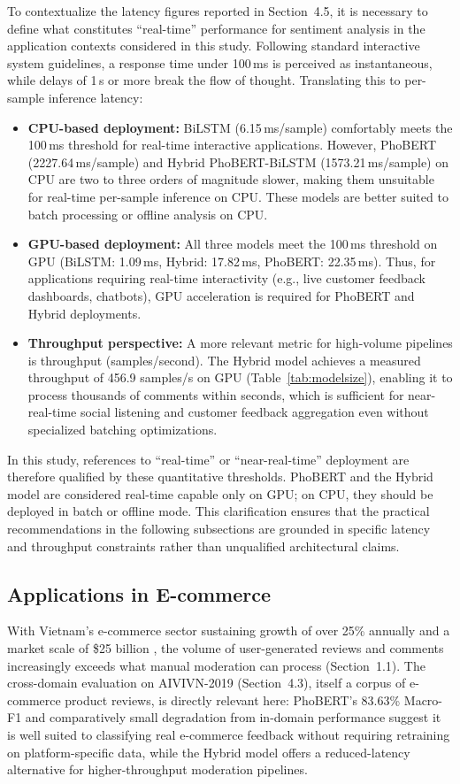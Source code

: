 \documentclass[12pt]{report} %
\begin{document}
To contextualize the latency figures reported in Section~4.5, it is necessary to define what constitutes ``real-time'' performance for sentiment analysis in the application contexts considered in this study. Following standard interactive system guidelines, a response time under 100\,ms is perceived as instantaneous, while delays of 1\,s or more break the flow of thought. Translating this to per-sample inference latency:

\begin{itemize}
    \item \textbf{CPU-based deployment:} BiLSTM (6.15\,ms/sample) comfortably meets the 100\,ms threshold for real-time interactive applications. However, PhoBERT (2227.64\,ms/sample) and Hybrid PhoBERT-BiLSTM (1573.21\,ms/sample) on CPU are two to three orders of magnitude slower, making them unsuitable for real-time per-sample inference on CPU. These models are better suited to batch processing or offline analysis on CPU.
    \item \textbf{GPU-based deployment:} All three models meet the 100\,ms threshold on GPU (BiLSTM: 1.09\,ms, Hybrid: 17.82\,ms, PhoBERT: 22.35\,ms). Thus, for applications requiring real-time interactivity (e.g., live customer feedback dashboards, chatbots), GPU acceleration is required for PhoBERT and Hybrid deployments.
    \item \textbf{Throughput perspective:} A more relevant metric for high-volume pipelines is throughput (samples/second). The Hybrid model achieves a measured throughput of 456.9 samples/s on GPU (Table~\ref{tab:modelsize}), enabling it to process thousands of comments within seconds, which is sufficient for near-real-time social listening and customer feedback aggregation even without specialized batching optimizations.
\end{itemize}

In this study, references to ``real-time'' or ``near-real-time'' deployment are therefore qualified by these quantitative thresholds. PhoBERT and the Hybrid model are considered real-time capable only on GPU; on CPU, they should be deployed in batch or offline mode. This clarification ensures that the practical recommendations in the following subsections are grounded in specific latency and throughput constraints rather than unqualified architectural claims.

\subsection{Applications in E-commerce}
With Vietnam's e-commerce sector sustaining growth of over 25\% annually and a market scale of \$25 billion \cite{vecom_2024}, the volume of user-generated reviews and comments increasingly exceeds what manual moderation can process (Section~1.1). The cross-domain evaluation on AIVIVN-2019 (Section~4.3), itself a corpus of e-commerce product reviews, is directly relevant here: PhoBERT's 83.63\% Macro-F1 and comparatively small degradation from in-domain performance suggest it is well suited to classifying real e-commerce feedback without requiring retraining on platform-specific data, while the Hybrid model offers a reduced-latency alternative for higher-throughput moderation pipelines.
\end{document}
